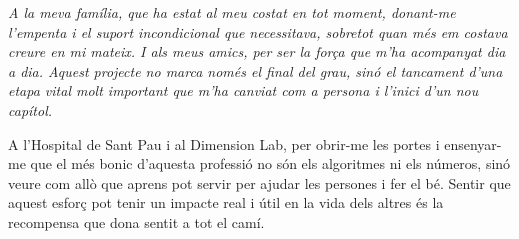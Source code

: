 \vspace*{3cm}
\begin{flushright}
{\fontsize{12}{15}\itshape\selectfont
A la meva família, que ha estat al meu costat en tot moment, donant-me l'empenta i el suport incondicional que necessitava, sobretot quan més em costava creure en mi mateix. I als meus amics, per ser la força que m'ha acompanyat dia a dia. Aquest projecte no marca només el final del grau, sinó el tancament d'una etapa vital molt important que m'ha canviat com a persona i l'inici d'un nou capítol.

\vspace{1em}
A l'Hospital de Sant Pau i al Dimension Lab, per obrir-me les portes i ensenyar-me que el més bonic d'aquesta professió no són els algoritmes ni els números, sinó veure com allò que aprens pot servir per ajudar les persones i fer el bé. Sentir que aquest esforç pot tenir un impacte real i útil en la vida dels altres és la recompensa que dona sentit a tot el camí.
}
\end{flushright}
